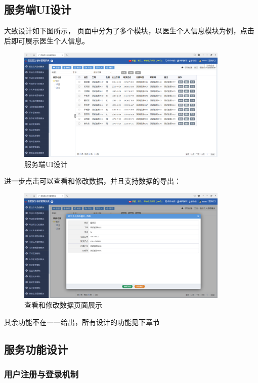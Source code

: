 \subsection{服务端UI设计}
大致设计如下图所示， 页面中分为了多个模块，以医生个人信息模块为例，点击后即可展示医生个人信息。

\begin{figure}[htbp]
	\centering
	\includegraphics[width=0.9\textwidth]{figures/111.png}
	\caption{服务端UI设计}
\end{figure}

进一步点击可以查看和修改数据，并且支持数据的导出：


\begin{figure}[htbp]
	\centering
	\includegraphics[width=0.9\textwidth]{figures/112.png}
	\caption{查看和修改数据页面展示}
\end{figure}

其余功能不在一一给出，所有设计的功能见下章节

\subsection{服务功能设计}
\subsubsection{用户注册与登录机制}

